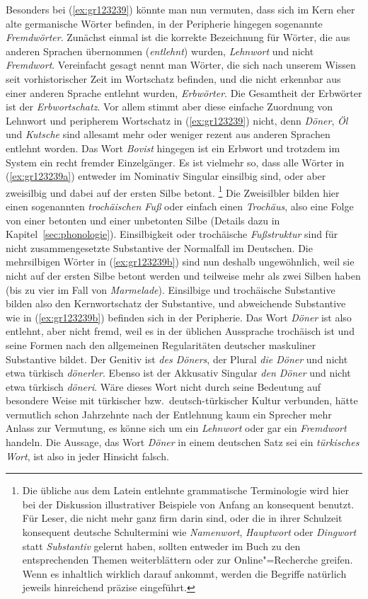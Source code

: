 Besonders bei (\ref{ex:gr123239}) könnte man nun vermuten, dass sich im Kern eher alte germanische Wörter befinden, in der Peripherie hingegen sogenannte \textit{Fremdwörter}.
Zunächst einmal ist die korrekte Bezeichnung für Wörter, die aus anderen Sprachen übernommen (\textit{entlehnt}) wurden, \textit{Lehnwort} und nicht \textit{Fremdwort}.
Vereinfacht gesagt nennt man Wörter, die sich nach unserem Wissen seit vorhistorischer Zeit im Wortschatz befinden, und die nicht erkennbar aus einer anderen Sprache entlehnt wurden, \textit{Erbwörter}.
Die Gesamtheit der Erbwörter ist der \textit{Erbwortschatz}.\label{abs:erbwortschatz}
Vor allem stimmt aber diese einfache Zuordnung von Lehnwort und peripherem Wortschatz in (\ref{ex:gr123239}) nicht, denn \textit{Döner}, \textit{Öl} und \textit{Kutsche} sind allesamt mehr oder weniger rezent aus anderen Sprachen entlehnt worden.
Das Wort \textit{Bovist} hingegen ist ein Erbwort und trotzdem im System ein recht fremder Einzelgänger.
Es ist vielmehr so, dass alle Wörter in (\ref{ex:gr123239a}) entweder im Nominativ Singular einsilbig sind, oder aber zweisilbig und dabei auf der ersten Silbe betont.%
\footnote{Die übliche aus dem Latein entlehnte grammatische Terminologie wird hier bei der Diskussion illustrativer Beispiele von Anfang an konsequent benutzt.
Für Leser, die nicht mehr ganz firm darin sind, oder die in ihrer Schulzeit konsequent deutsche Schultermini wie \zB \textit{Namenwort}, \textit{Hauptwort} oder \textit{Dingwort} statt \textit{Substantiv} gelernt haben, sollten entweder im Buch zu den entsprechenden Themen weiterblättern oder zur Online"=Recherche greifen.
Wenn es inhaltlich wirklich darauf ankommt, werden die Begriffe natürlich jeweils hinreichend präzise eingeführt.}
Die Zweisilbler bilden hier einen sogenannten \textit{trochäischen Fuß} oder einfach einen \textit{Trochäus}, also eine Folge von einer betonten und einer unbetonten Silbe (Details dazu in Kapitel~\ref{sec:phonologie}).
Einsilbigkeit oder trochäische \textit{Fußstruktur} sind für nicht zusammengesetzte Substantive der Normalfall im Deutschen.
Die mehrsilbigen Wörter in (\ref{ex:gr123239b}) sind nun deshalb ungewöhnlich, weil sie nicht auf der ersten Silbe betont werden und teilweise mehr als zwei Silben haben (bis zu vier im Fall von \textit{Marmelade}).
Einsilbige und trochäische Substantive bilden also den Kernwortschatz der Substantive, und abweichende Substantive wie in (\ref{ex:gr123239b}) befinden sich in der Peripherie.
Das Wort \textit{Döner} ist also entlehnt, aber nicht fremd, weil es in der üblichen Aussprache trochäisch ist und seine Formen nach den allgemeinen Regularitäten deutscher maskuliner Substantive bildet.
Der Genitiv ist \textit{des Döners}, der Plural \textit{die Döner} und nicht etwa türkisch \textit{dönerler}.
Ebenso ist der Akkusativ Singular \textit{den Döner} und nicht etwa türkisch \textit{döneri}.
Wäre dieses Wort nicht durch seine Bedeutung auf besondere Weise mit türkischer bzw.\ deutsch-türkischer Kultur verbunden, hätte vermutlich schon Jahrzehnte nach der Entlehnung kaum ein Sprecher mehr Anlass zur Vermutung, es könne sich um ein \textit{Lehnwort} oder gar ein \textit{Fremdwort} handeln.
Die Aussage, das Wort \textit{Döner} in einem deutschen Satz sei ein \textit{türkisches Wort}, ist also in jeder Hinsicht falsch.

